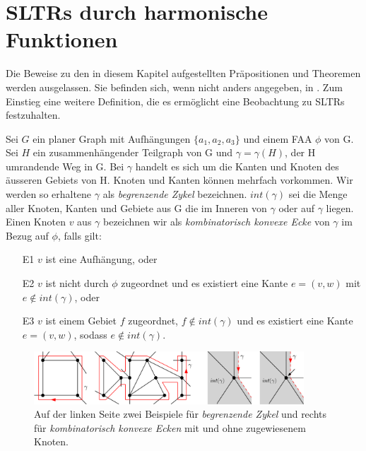 \section{SLTRs durch harmonische Funktionen}\label{harmonic_approach}

Die Beweise zu den in diesem Kapitel aufgestellten Präpositionen und Theoremen werden ausgelassen. Sie befinden sich, wenn nicht anders angegeben, in \cite{af13} . Zum Einstieg eine weitere Definition, die es ermöglicht eine Beobachtung zu SLTRs festzuhalten.

\begin{definition}
Sei $G$ ein planer Graph mit Aufhängungen $\{a_1,a_2,a_3\}$ und einem FAA $\phi$ von G. Sei $H$ ein zusammenhängender Teilgraph von G und $\gamma=\gamma(H)$, der H umrandende Weg in G. Bei $\gamma$ handelt es sich um die Kanten und Knoten des äusseren Gebiets von H. Knoten und Kanten können mehrfach vorkommen. Wir werden so erhaltene $\gamma$ als \textit{begrenzende Zykel} bezeichnen. $int(\gamma)$ sei die Menge aller Knoten, Kanten und Gebiete aus G die im Inneren von $\gamma$ oder auf $\gamma$ liegen. Einen Knoten $v$ aus $\gamma$ bezeichnen wir als \textit{kombinatorisch konvexe Ecke} von $\gamma$ im Bezug auf $\phi$, falls gilt:
\begin{itemize}
\item [E1] $v$ ist eine Aufhängung, oder
\item [E2] $v$ ist nicht durch $\phi$ zugeordnet und es existiert eine Kante $e = (v,w)$ mit $e \notin int(\gamma)$, oder
\item [E3] $v$ ist einem Gebiet $f$ zugeordnet, $f \notin int(\gamma)$ und es existiert eine Kante $e = (v,w)$, sodass $e \notin int(\gamma)$.
\end{itemize}

\end{definition}

\begin{figure}[h]
	\centering
  \includegraphics[width=0.9\textwidth]{corner_def.png}
  \caption{Auf der linken Seite zwei Beispiele für \textit{begrenzende Zykel} und rechts für \textit{kombinatorisch konvexe Ecken} mit und ohne zugewiesenem Knoten.}
\end{figure}

